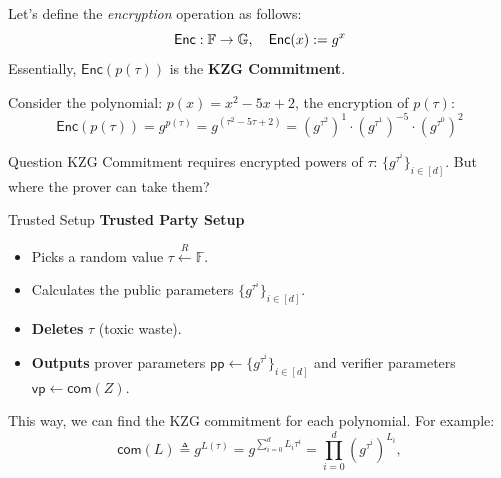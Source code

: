 \documentclass{zkdl-presentation-template}
\begin{document}
    \begin{frame}
        Let's define the \textit{encryption} operation as follows:
        \vspace{-10pt}
        \begin{equation*}
            \mathsf{Enc}: \mathbb{F} \to \mathbb{G}, \quad \mathsf{Enc}(x) := g^x
            \vspace{-5pt}
        \end{equation*}\pause
        Essentially, $\mathsf{Enc}(p(\tau))$ is the \textbf{KZG Commitment}. 
        \begin{example}
            Consider the polynomial: $p(x) = x^2 - 5x + 2$, the encryption of $p(\tau)$:
            {\large
            \begin{equation*}
                \mathsf{Enc}(p(\tau)) = g^{p(\tau)} = g^{\left( \tau^2 - 5\tau + 2 \right)}  = \left( g^{\tau^2} \right)^1 \cdot {\left( g^{\tau^1} \right)}^{-5} \cdot \left(g^{\tau^0}\right)^2
            \end{equation*}}
        \end{example}\pause
        \begin{alertblock}{Question}
            KZG Commitment requires encrypted powers of $\tau$: $\{g^{\tau^i}\}_{i \in [d]}$. But 
            where the prover can take them?
        \end{alertblock}
    \end{frame}

    \begin{frame}{Trusted Setup}
        \textbf{Trusted Party Setup}
        \vspace{-5pt}
        \begin{itemize}[label=]
            \item \vspace{-3pt} Picks a random value $\tau \xleftarrow{R} \mathbb{F}$. \pause
            \item \vspace{-3pt} Calculates the public parameters $\{g^{\tau^i}\}_{i \in [d]}$.\pause
            \item \vspace{-3pt} \textbf{Deletes} $\tau$ (toxic waste).\pause
            \item \vspace{-3pt} \textbf{Outputs} prover parameters $\mathsf{pp} \gets \{g^{\tau^i}\}_{i \in [d]}$ and verifier parameters $\mathsf{vp} \gets \mathsf{com}(Z)$. \pause
        \end{itemize} \pause

        This way, we can find the KZG commitment for each polynomial. For example:
        \begin{equation*}
            \mathsf{com}(L) \triangleq g^{L(\tau)} = g^{\sum_{i=0}^d L_i \tau^i} = \prod_{i=0}^d (g^{\tau^i})^{L_i},
        \end{equation*}
    \end{frame}
\end{document}
